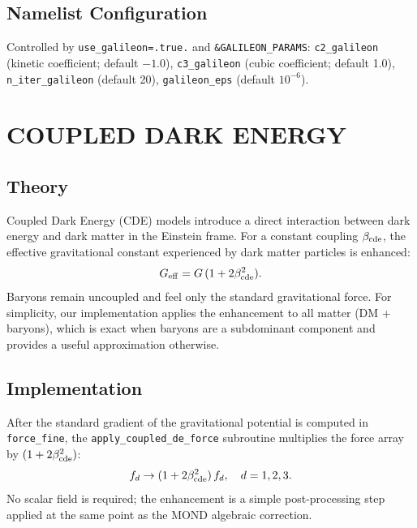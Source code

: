 \documentclass[fleqn,usenatbib]{mnras}
\newcommand{\code}[1]{\texttt{#1}}
\newcommand{\Geff}{G_{\rm eff}}
\newcommand{\betacde}{\beta_{\rm cde}}
\begin{document}
\subsection{Namelist Configuration}

Controlled by \code{use\_galileon=.true.} and
\code{\&GALILEON\_PARAMS}:
\code{c2\_galileon} (kinetic coefficient; default $-1.0$),
\code{c3\_galileon} (cubic coefficient; default 1.0),
\code{n\_iter\_galileon} (default 20),
\code{galileon\_eps} (default $10^{-6}$).


\section{COUPLED DARK ENERGY}
\label{sec:coupled_de}

\subsection{Theory}

Coupled Dark Energy (CDE) models
\citep{Amendola2000,Amendola2004,Pettorino2008} introduce a direct
interaction between dark energy and dark matter in the Einstein frame.
For a constant coupling $\betacde$, the effective gravitational
constant experienced by dark matter particles is enhanced:
\begin{equation}
\Geff = G\,(1 + 2\betacde^2).
\label{eq:Geff_cde}
\end{equation}
Baryons remain uncoupled and feel only the standard gravitational
force.  For simplicity, our implementation applies the enhancement
to all matter (DM + baryons), which is exact when baryons are a
subdominant component and provides a useful approximation otherwise.

\subsection{Implementation}

After the standard gradient of the gravitational potential is computed
in \code{force\_fine}, the \code{apply\_coupled\_de\_force} subroutine
multiplies the force array by $(1+2\betacde^2)$:
\begin{equation}
f_d \to (1 + 2\betacde^2)\,f_d, \quad d = 1,2,3.
\end{equation}
No scalar field is required; the enhancement is a simple
post-processing step applied at the same point as the MOND algebraic
correction.
\end{document}
